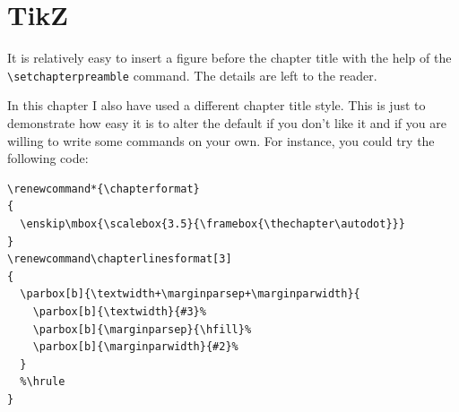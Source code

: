 \section{TikZ}

It is relatively easy to insert a figure before the chapter title with 
the help of the \verb|\setchapterpreamble| command. The details are left 
to the reader.

In this chapter I also have used a different chapter title style. This 
is just to demonstrate how easy it is to alter the default if you don't 
like it and if you are willing to write some commands on your own. For 
instance, you could try the following code:

\begin{lstlisting}
\renewcommand*{\chapterformat}
{
  \enskip\mbox{\scalebox{3.5}{\framebox{\thechapter\autodot}}}
}
\renewcommand\chapterlinesformat[3]
{
  \parbox[b]{\textwidth+\marginparsep+\marginparwidth}{
	\parbox[b]{\textwidth}{#3}%
	\parbox[b]{\marginparsep}{\hfill}%
	\parbox[b]{\marginparwidth}{#2}%
  }
  %\hrule
}
\end{lstlisting}
